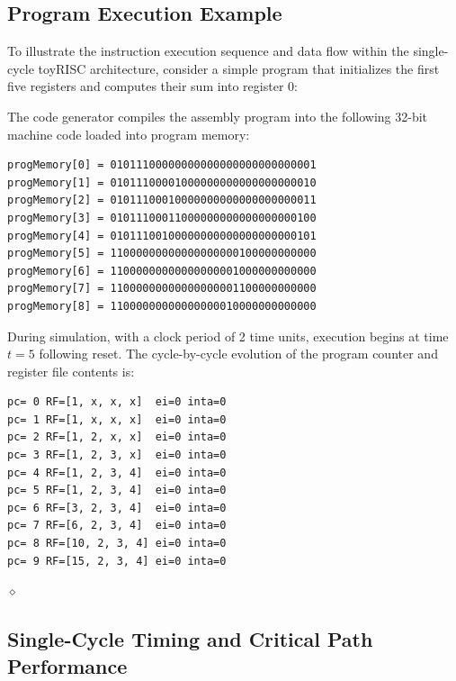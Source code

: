 \subsection{Program Execution Example}\label{sec:toyrisc_programs}

\begin{exemplu}\label{exADD}
To illustrate the instruction execution sequence and data flow within the single-cycle toyRISC architecture, consider a simple program that initializes the first five registers and computes their sum into register 0:


The code generator compiles the assembly program into the following 32-bit machine code loaded into program memory:
{\small
\begin{verbatim}
progMemory[0] = 01011100000000000000000000000001
progMemory[1] = 01011100001000000000000000000010
progMemory[2] = 01011100010000000000000000000011
progMemory[3] = 01011100011000000000000000000100
progMemory[4] = 01011100100000000000000000000101
progMemory[5] = 11000000000000000000100000000000
progMemory[6] = 11000000000000000001000000000000
progMemory[7] = 11000000000000000001100000000000
progMemory[8] = 11000000000000000010000000000000
\end{verbatim}
}

During simulation, with a clock period of 2 time units, execution begins at time $t = 5$ following reset. The cycle-by-cycle evolution of the program counter and register file contents is:
{\small
\begin{verbatim}
pc= 0 RF=[1, x, x, x]  ei=0 inta=0
pc= 1 RF=[1, x, x, x]  ei=0 inta=0
pc= 2 RF=[1, 2, x, x]  ei=0 inta=0
pc= 3 RF=[1, 2, 3, x]  ei=0 inta=0
pc= 4 RF=[1, 2, 3, 4]  ei=0 inta=0
pc= 5 RF=[1, 2, 3, 4]  ei=0 inta=0
pc= 6 RF=[3, 2, 3, 4]  ei=0 inta=0
pc= 7 RF=[6, 2, 3, 4]  ei=0 inta=0
pc= 8 RF=[10, 2, 3, 4] ei=0 inta=0
pc= 9 RF=[15, 2, 3, 4] ei=0 inta=0
\end{verbatim}
}
$\diamond$
\end{exemplu}

\subsection{Single-Cycle Timing and Critical Path Performance}\label{sec:toyrisc_timing}


